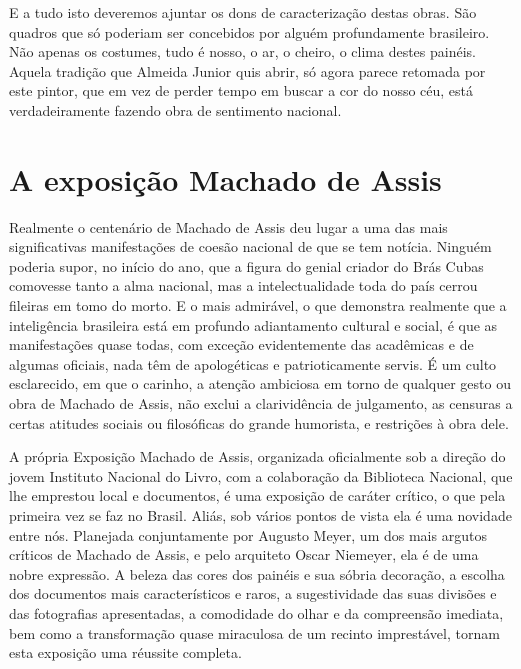 E a tudo isto deveremos ajuntar os dons de caracterização destas obras.
São quadros que só poderiam ser concebidos por alguém profundamente
brasileiro. Não apenas os costumes, tudo é nosso, o ar, o cheiro, o
clima destes painéis. Aquela tradição que Almeida Junior quis abrir, só
agora parece retomada por este pintor, que em vez de perder tempo em
buscar a cor do nosso céu, está verdadeiramente fazendo obra de
sentimento nacional.

\chapter{A exposição Machado de Assis}

Realmente o centenário de Machado de Assis deu lugar a uma das mais
significativas manifestações de coesão nacional de que se tem notícia.
Ninguém poderia supor, no início do ano, que a figura do genial criador
do Brás Cubas comovesse tanto a alma nacional, mas a intelectualidade
toda do país cerrou fileiras em tomo do morto. E o mais admirável, o que
demonstra realmente que a inteligência brasileira está em profundo
adiantamento cultural e social, é que as manifestações quase todas, com
exceção evidentemente das acadêmicas e de algumas oficiais, nada têm de
apologéticas e patrioticamente servis. É um culto esclarecido, em que o
carinho, a atenção ambiciosa em torno de qualquer gesto ou obra de
Machado de Assis, não exclui a clarividência de julgamento, as censuras
a certas atitudes sociais ou filosóficas do grande humorista, e
restrições à obra dele.

A própria Exposição Machado de Assis, organizada oficialmente sob a
direção do jovem Instituto Nacional do Livro, com a colaboração da
Biblioteca Nacional, que lhe emprestou local e documentos, é uma
exposição de caráter crítico, o que pela primeira vez se faz no Brasil.
Aliás, sob vários pontos de vista ela é uma novidade entre nós.
Planejada conjuntamente por Augusto Meyer, um dos mais argutos críticos
de Machado de Assis, e pelo arquiteto Oscar Niemeyer, ela é de uma nobre
expressão. A beleza das cores dos painéis e sua sóbria decoração, a
escolha dos documentos mais característicos e raros, a sugestividade das
suas divisões e das fotografias apresentadas, a comodidade do olhar e da
compreensão imediata, bem como a transformação quase miraculosa de um
recinto imprestável, tornam esta exposição uma réussite completa.

